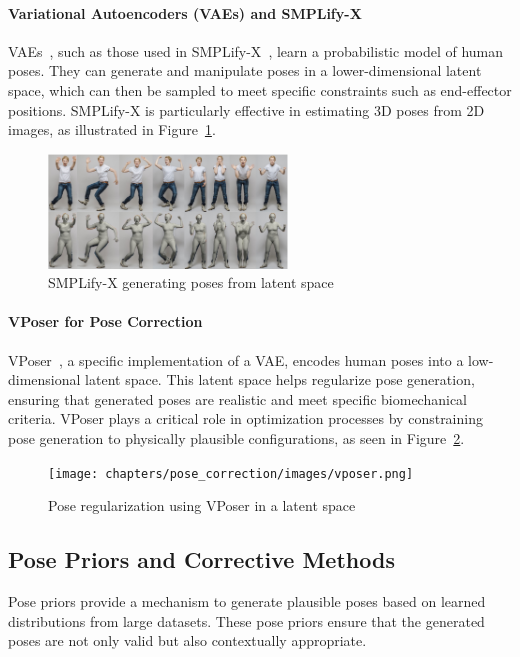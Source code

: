 \documentclass[../../main.tex]{subfiles}
\begin{document}
\paragraph{Variational Autoencoders (VAEs) and SMPLify-X} VAEs~\cite{kingma2013auto}, such as those used in SMPLify-X~\cite{pavlakos2019expressive}, learn a probabilistic model of human poses. They can generate and manipulate poses in a lower-dimensional latent space, which can then be sampled to meet specific constraints such as end-effector positions. SMPLify-X is particularly effective in estimating 3D poses from 2D images, as illustrated in Figure~\ref{fig:simplifyx}.

\begin{figure}
  \centering \includegraphics[width = 2.5in]{chapters/pose_correction/images/simplifyx.png}
  \caption{SMPLify-X generating poses from latent space}
  \label{fig:simplifyx}
\end{figure}

\paragraph{VPoser for Pose Correction} VPoser~\cite{pavlakos2019expressive}, a specific implementation of a VAE, encodes human poses into a low-dimensional latent space. This latent space helps regularize pose generation, ensuring that generated poses are realistic and meet specific biomechanical criteria. VPoser plays a critical role in optimization processes by constraining pose generation to physically plausible configurations, as seen in Figure~\ref{fig:vposer}.

\begin{figure}
  \centering \texttt{[image: chapters/pose\_correction/images/vposer.png]}
  \caption{Pose regularization using VPoser in a latent space}
  \label{fig:vposer}
\end{figure}

\subsection{Pose Priors and Corrective Methods}
\label{ch:pose_correction:related_work:pose_priors}
Pose priors provide a mechanism to generate plausible poses based on learned distributions from large datasets. These pose priors ensure that the generated poses are not only valid but also contextually appropriate.
\end{document}
